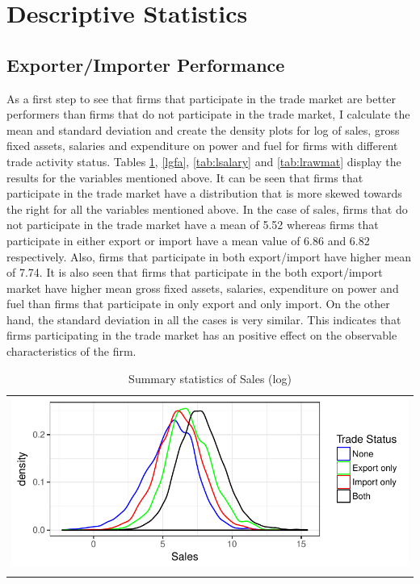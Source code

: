 \documentclass[11pt]{article}
\begin{document}
\section{Descriptive Statistics}
\subsection{Exporter/Importer Performance}
As a first step to see that firms that participate in the trade market
are better performers than firms that do not participate in the trade market, I calculate the mean and standard
deviation and create the density plots for log of  sales, gross fixed assets,
salaries and  expenditure on power and fuel for firms with different
trade activity status. 
Tables \ref{lsales}, \ref{lgfa}, \ref{tab:lsalary} and
\ref{tab:lrawmat} display the results for the variables mentioned above. 
It can be seen that firms that participate in the trade market have
a distribution that is more skewed towards the right for all the
variables mentioned above. In the case of sales, firms that do not
participate in the trade market have a mean of 5.52 whereas firms that
participate in either export or import have a mean value of 6.86 and
6.82 respectively. Also, firms that participate in both export/import
have higher mean of 7.74.  It is also seen
that firms that participate in the both export/import market have
higher mean gross fixed assets,
salaries, expenditure on power and fuel than firms that participate in
only export and only import. On the other hand, the standard deviation in all
the cases is very similar. This indicates that firms participating
in the trade market has an positive effect on the observable characteristics of the firm.
\begin{center}
\begin{table}[H]
\caption{Summary statistics of Sales (log)}
\label{lsales}
\begin{tabular}{c}
 \includegraphics{./PICS/denslsales.pdf}   \\ 
   \\  
\end{tabular}
\end{table}
\end{center}
\end{document}
